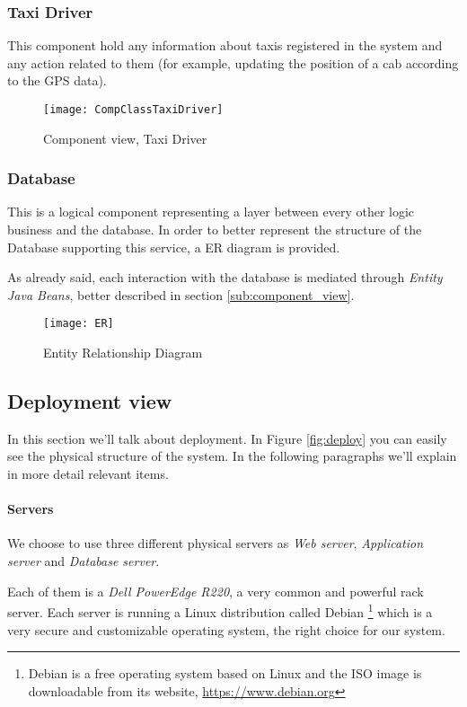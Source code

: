 \pagebreak
\subsubsection{Taxi Driver} %
This component hold any information about taxis registered in the system and 
any action related to them (for example, updating the position of a cab according to the GPS data).
\begin{figure}[H]
    \centering
    \texttt{[image: CompClassTaxiDriver]}
    \caption{Component view, Taxi Driver}
    \label{fig:compclasstaxidriver}
\end{figure}

\pagebreak
\subsubsection{Database} %
\label{par:db}
This is a logical component representing a layer between every other logic 
business and the database. 
In order to better represent the structure of the Database supporting this service, 
a ER diagram is provided. 

As already said, each interaction with the database is mediated through \emph{Entity Java Beans}, 
better described in section \ref{sub:component_view}.

\begin{figure}[h!]
    \centering
    \texttt{[image: ER]}
    \caption{Entity Relationship Diagram}
    \label{fig:er}
\end{figure}

\pagebreak
\subsection{Deployment view}
\label{sec:deploy}
In this section we'll talk about deployment. In Figure \ref{fig:deploy} 
you can easily see the physical structure of the system. In the following
paragraphs we'll explain in more detail relevant items.

\paragraph{Servers} We choose to use three different physical servers as 
\emph{Web server}, \emph{Application server} and \emph{Database server}. 

Each of them is a \emph{Dell PowerEdge R220}\cite{r220}, a very common and 
powerful rack server.
Each server is running a Linux distribution called Debian
\footnote{Debian is a free operating system based on Linux and the ISO image is downloadable from its website, 
\url{https://www.debian.org}}
which is a very secure and customizable operating system, the right choice for our system. 

